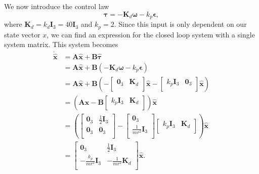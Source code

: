 \subsection{}
We now introduce the control law
\begin{equation}
  \label{eq:control_law}
  \mathbf{\tau} = -\mathbf{K}_d \boldsymbol{\omega} - k_p \boldsymbol{\epsilon},
\end{equation}
where $\mathbf{K}_d = k_d \mathbf{I}_3 = 40 \mathbf{I}_3$ and $k_p = 2$. Since this input is only dependent on our state vector $x$, we can find an expression for the closed loop system with a single system matrix. This system becomes
\begin{equation}\begin{aligned}
\dot{\hat{ \mathbf{x}}}
&= \mathbf{A}\hat{\mathbf{x}} + \mathbf{B}\hat{\boldsymbol{\tau}} \\
&= \mathbf{A}\hat{\mathbf{x}} + \mathbf{B}(-\mathbf{K}_d \boldsymbol{\omega} - k_p \boldsymbol{\epsilon}) \\
&= \mathbf{A}\hat{\mathbf{x}} + \mathbf{B}(
-\begin{bmatrix}
\mathbf{0}_3 & \mathbf{K}_d \\
\end{bmatrix} \hat{\mathbf{x}}
-\begin{bmatrix}
k_p \mathbf{I}_3 & \mathbf{0}_3 \\
\end{bmatrix}\hat{\mathbf{x}}
) \\
&= (\mathbf{A}\hat{\mathbf{x}} - \mathbf{B}
\begin{bmatrix}
k_p \mathbf{I}_3 & \mathbf{K}_d \\
\end{bmatrix}
) \hat{\mathbf{x}} \\
&= \left(
\begin{bmatrix}
\mathbf{0}_3 & \frac{1}{2}\mathbf{I}_3 \\
\mathbf{0}_3 & \mathbf{0}_3 \\
\end{bmatrix}
-
\begin{bmatrix}
\mathbf{0}_3\\
\frac{1}{mr^2}\mathbf{I}_3\\
\end{bmatrix}
\begin{bmatrix}
k_p\mathbf{I}_3 & \mathbf{K}_d \\
\end{bmatrix}
\right) \hat{\mathbf{x}} \\
&=
\begin{bmatrix}
\mathbf{0}_3 & \frac{1}{2}\mathbf{I}_3 \\
-\frac{k_p}{mr^2}\mathbf{I}_3& -\frac{1}{mr^2}\mathbf{K}_d \\
\end{bmatrix}
\hat{\mathbf{x}}.
\end{aligned}\end{equation}
